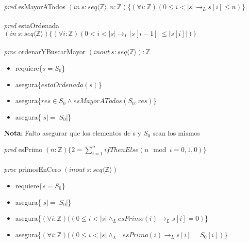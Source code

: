 \documentclass{article}
\begin{document}
{\begin{itemize}
{    \item [b) ] \textit{pred} esMayorATodos $(\textit{in}\ s:seq\langle\mathbb{Z}\rangle,n:\mathbb{Z})\{(\forall i:\mathbb{Z})(0\leq i<|s| \to_L s[i]\leq n)\}$\\\\
    \textit{pred} estaOrdenada $(\textit{in}\ s:seq\langle\mathbb{Z}\rangle)\{(\forall i:\mathbb{Z})(0<i<|s| \to_L |s[i-1]|\leq |s[i]|)\}$\\\\
    \textit{proc} ordenarYBuscarMayor $(\textit{inout}\ s:seq\langle\mathbb{Z}\rangle):\mathbb{Z}$
    \begin{itemize}
        \item []requiere\{$s=S_0$\}
        \item []asegura\{$estaOrdenada(s)$\}
        \item []asegura\{$res \in S_0 \land esMayorATodos(S_0,res)$\}
        \item []asegura\{$|s|=|S_0|$\}
    \end{itemize}
    \textbf{Nota}: Falto asegurar que los elementos de s y $S_0$ sean los mismos
    \item [c) ]\textit{pred} esPrimo $(n:\mathbb{Z})\{2=\displaystyle\sum_{i=1}^{n}ifThenElse(n \mod i=0,1,0)\}$\\\\
    \textit{proc} primosEnCero $(\textit{inout}\ s:seq\langle\mathbb{Z}\rangle)$
    \begin{itemize}
        \item []requiere\{$s=S_0$\}
        \item []asegura\{$|s|=|S_0|$\}
        \item []asegura\{$(\forall i:\mathbb{Z})((0\leq i<|s| \land_L esPrimo(i) \to_L s[i]=0)$\}
        \item []asegura\{$(\forall i:\mathbb{Z})((0\leq i<|s| \land_L \neg esPrimo(i) \to_L s[i]=S_0[i])$\}
        

\end{itemize}}
\end{itemize}}
\end{document}
